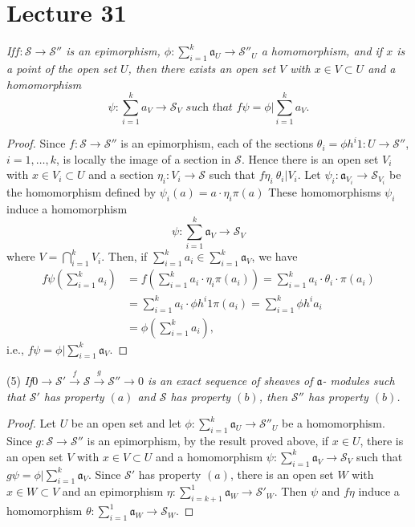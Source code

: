 \chapter{Lecture 31}\label{chap31:lec31}%

\textit{If\pageoriginale $f : \mathscr{S} \to \mathscr{S}''$ is an epimorphism,
  $\phi : \sum^k_{i=1} \mathfrak{a}_U \to \mathscr{S}''_U$ a homomorphism, and if
  $x$ is a point of the open set $U$, then there exists an open set
  $V$ with $x \in V \subset U$ and a homomorphism} 
$$
\psi : \sum^k_{i=1} a_V \to \mathscr{S}_V \textit{ such that } f \psi
= \phi | \sum^k_{i=1} a_V. 
$$

\begin{proof}
Since $f : \mathscr{S} \to \mathscr{S}''$ is an epimorphism, each of
the sections $\theta_i = \phi h^i 1: U \to \mathscr{S}''$, $i = 1,
\ldots ,k$, is locally the image of a section in $\mathscr{S}$. Hence
there is an open set $V_i$ with $x \in V_i \subset U$ and a section
$\eta_i : V_i \to \mathscr{S}$ such that $f \eta _i \ \theta_i | V_i$.  
Let $\psi_i : \mathfrak{a}_{V_i} \to \mathscr{S}_{V_i}$ be the homomorphism
defined by $ \psi_i (a) = a \cdot \eta_i \pi (a)$ These homomorphisms
$\psi_i$ induce a homomorphism  
$$
\psi : \sum^k_{i=1} \mathfrak{a}_V \to \mathscr{S}_V 
$$
where $V = \bigcap^k_{i=1} V_i$. Then, if $\sum^k_{i=1}a_i \in
\sum^k_{i=1} \mathfrak{a}_V$, we have 
  \begin{align*}
f \psi (\sum^k_{i=1}a_i) & = f(\sum^k_{i=1}a_i \cdot \eta_i \pi
(a_i)) = \sum^k_{i=1}a_i \cdot  \theta_i  \cdot \pi (a_i)\\
& = \sum^k_{i=1}a_i \cdot \phi h^i 1 \pi
(a_i) = \sum^k_{i=1} \phi h^i a_i\\
& = \phi (\sum^k_{i=1 }a_i),
 \end{align*}  
 i.e.,  $f \psi = \phi | \sum ^k_{i=1} \mathfrak{a}_V$.
\end{proof}

 \noindent
(5) \qquad \textit{If\pageoriginale $0 \to \mathscr{S}'
   \xrightarrow{f} \mathscr{S} \xrightarrow{g} \mathscr{S}''\to 0 $
   is an exact sequence of 
   sheaves of $\mathfrak{a}$- modules such that $\mathscr{S}'$ has
   property $(a)$ and $\mathscr{S}$ has property $(b)$, then
   $\mathscr{S}''$ has property $(b)$.} 
 
 \begin{proof}
Let $U$ be an open set and let $\phi : \sum^{k}_{i=1} \mathfrak{a}_U \to
\mathscr{S}''_U$  be a homomorphism. Since $g : \mathscr{S} \to
\mathscr{S}''$ is an epimorphism, by the result proved above, if $x
\in U$, there is an open set $V$ with $x \in V \subset U$ and a
homomorphism $\psi : \sum^{k}_{i=1} \mathfrak{a}_V \to \mathscr{S}_V$
such that $g \psi =\phi | \sum^{k}_{i=1} \mathfrak{a}_V$. Since $\mathscr{S}'$
has property $(a)$, there is an open set $W$ with $x \in W \subset V$
and an epimorphism $\eta : \sum^{1}_{i=k+1} \mathfrak{a}_W \to \mathscr{S}'_W
$. Then $\psi $ and $f \eta$ induce a homomorphism $\theta :
\sum^{1}_{i=1} \mathfrak{a}_W \to \mathscr{S}_W$.  
 \end{proof} 
 
